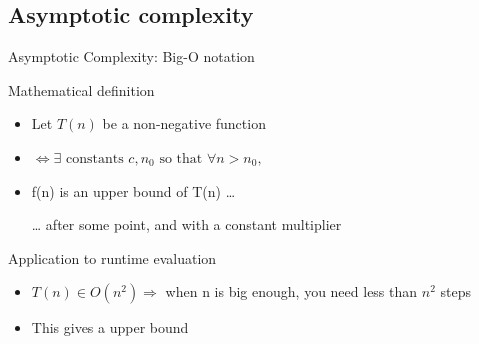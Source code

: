\subsection{Asymptotic complexity}
\begin{frame}{Asymptotic Complexity: Big-O notation}
  \begin{block}{Mathematical definition}
    \begin{itemize}
    \item Let $T(n)$ be a non-negative function
    \item {} 
      $\Leftrightarrow \exists \text{ constants } c, n_0 
      \text{ so that } \forall n>n_0,$ 
    \item f(n) is an upper bound of T(n) \ldots
    \item[\ldots] after some point, and with a constant multiplier
    \end{itemize}
  \end{block}

  \begin{block}{Application to runtime evaluation}
    \begin{itemize}
    \item $T(n)\in O(n^2)\Rightarrow$ when n is big enough, you need less than $n^2$ steps
    \item This gives a upper bound
    \end{itemize}
  \end{block}
\end{frame}
